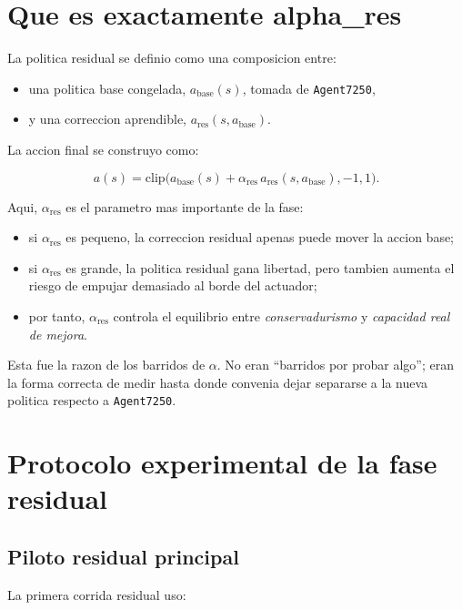 \documentclass[11pt,a4paper]{article}
\begin{document}
\section{Que es exactamente alpha\_res}

La politica residual se definio como una composicion entre:

\begin{itemize}[leftmargin=1.6em]
\item una politica base congelada, \(a_{\mathrm{base}}(s)\), tomada de \texttt{Agent7250},
\item y una correccion aprendible, \(a_{\mathrm{res}}(s,a_{\mathrm{base}})\).
\end{itemize}

La accion final se construyo como:

\[
a(s) = \mathrm{clip}\Big(a_{\mathrm{base}}(s) + \alpha_{\mathrm{res}}\, a_{\mathrm{res}}(s,a_{\mathrm{base}}), -1, 1\Big).
\]

Aqui, \(\alpha_{\mathrm{res}}\) es el parametro mas importante de la fase:

\begin{itemize}[leftmargin=1.6em]
\item si \(\alpha_{\mathrm{res}}\) es pequeno, la correccion residual apenas puede mover la accion base;
\item si \(\alpha_{\mathrm{res}}\) es grande, la politica residual gana libertad, pero tambien aumenta el riesgo de empujar demasiado al borde del actuador;
\item por tanto, \(\alpha_{\mathrm{res}}\) controla el equilibrio entre \emph{conservadurismo} y \emph{capacidad real de mejora}.
\end{itemize}

Esta fue la razon de los barridos de \(\alpha\). No eran ``barridos por probar algo''; eran la forma correcta de medir hasta donde convenia dejar separarse a la nueva politica respecto a \texttt{Agent7250}.

\section{Protocolo experimental de la fase residual}

\subsection{Piloto residual principal}

La primera corrida residual uso:
\end{document}
